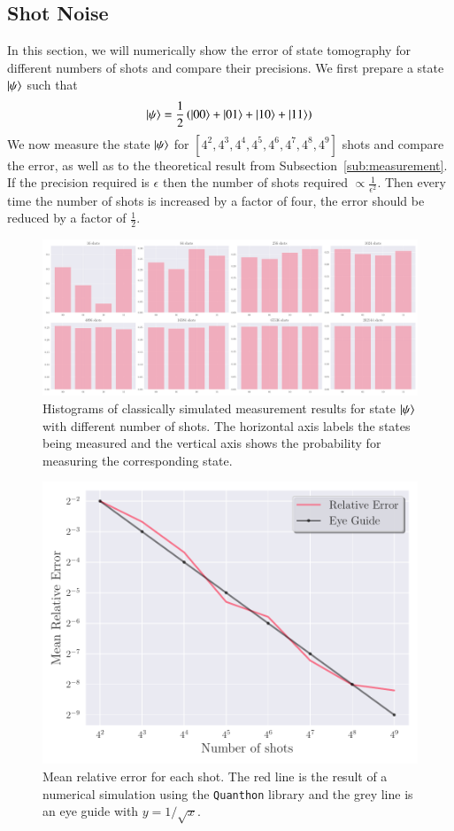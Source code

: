\subsection{Shot Noise}%
\label{sub:shot_noise}
In this section, we will numerically show the error of state tomography for different numbers of shots and compare their precisions. We first prepare a state $ \ket{\psi}  $ such that
\[ \ket{\psi} = \frac{1}{2} \left( \ket{00} + \ket{01} + \ket{10} + \ket{11} \right)  \] 
We now measure the state $ \ket{\psi} $ for $ [4^2, 4^3, 4^4, 4^5, 4^6, 4^7, 4^8, 4^9]$ shots and compare the error, as well as to the theoretical result from Subsection~\ref{sub:measurement}. If the precision required is $ \epsilon $ then the number of shots required $ \propto \frac{1}{\epsilon^2} $. Then every time the number of shots is increased by a factor of four, the error should be reduced by a factor of $\frac{1}{2}$. 
\begin{figure}[ht]
	\centering
	\includegraphics[width=\linewidth]{image/measurements_histogram.pdf}
	\caption{Histograms of classically simulated measurement results for state $\ket{\psi} $ with different number of shots. The horizontal axis labels the states being measured and the vertical axis shows the probability for measuring the corresponding state.}
	\label{fig:meas_result}
\end{figure}


\begin{figure}[ht]
	\centering
	\includegraphics[width=0.8\linewidth]{image/mean_rel_error.pdf}
	\caption{Mean relative error for each shot. The red line is the result of a numerical simulation using the \texttt{Quanthon} library and the grey line is an eye guide with $ y = 1/\sqrt{x} $.}
	\label{fig:mean_rel_err}
\end{figure}

